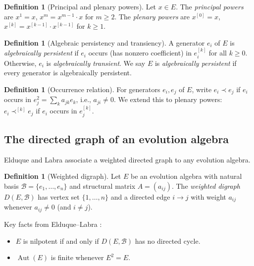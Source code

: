 \documentclass[12pt,a4paper]{amsart}
\theoremstyle{definition}
\newtheorem{definition}[theorem]{Definition}
\DeclareMathOperator{\Aut}{Aut}
\newcommand{\EA}{E}          %
\newcommand{\natbasis}{\mathcal{B}}  %
\newcommand{\strmat}{A}      %
\begin{document}
\begin{definition}[Principal and plenary powers]\label{def:powers}
Let $x\in\EA$.  The \emph{principal powers} are $x^1=x$, $x^m=x^{m-1}\cdot x$ for
$m\ge 2$.  The \emph{plenary powers} are $x^{[0]}=x$, $x^{[k]}=
x^{[k-1]}\cdot x^{[k-1]}$ for $k\ge 1$.
\end{definition}

\begin{definition}[Algebraic persistency and transiency]\label{def:persist}
A generator $e_i$ of $\EA$ is \emph{algebraically persistent} if $e_i$
occurs (has nonzero coefficient) in $e_i^{[k]}$ for all $k\ge 0$.
Otherwise, $e_i$ is \emph{algebraically transient}.  We say $\EA$ is
\emph{algebraically persistent} if every generator is algebraically
persistent.
\end{definition}

\begin{definition}[Occurrence relation]\label{def:occur}
For generators $e_i,e_j$ of $\EA$, write $e_i\prec e_j$ if $e_i$
occurs in $e_j^2=\sum_k a_{jk} e_k$, i.e., $a_{ji}\ne 0$.  We extend
this to plenary powers: $e_i\prec^{[k]} e_j$ if $e_i$ occurs in
$e_j^{[k]}$.
\end{definition}

\subsection{The directed graph of an evolution algebra}

Elduque and Labra \cite{ElduqueLabra2013} associate a weighted directed
graph to any evolution algebra.

\begin{definition}[Weighted digraph]\label{def:digraph}
Let $\EA$ be an evolution algebra with natural basis $\natbasis=
\{e_1,\ldots,e_n\}$ and structural matrix $\strmat=(a_{ij})$.  The
\emph{weighted digraph} $D(\EA,\natbasis)$ has vertex set $\{1,\ldots,n\}$
and a directed edge $i\to j$ with weight $a_{ij}$ whenever
$a_{ij}\ne 0$ (and $i\ne j$).
\end{definition}

Key facts from Elduque--Labra \cite{ElduqueLabra2013}:
\begin{itemize}
  \item $\EA$ is nilpotent if and only if $D(\EA,\natbasis)$ has no
        directed cycle.
  \item $\Aut(\EA)$ is finite whenever $\EA^2=\EA$.
\end{itemize}
\end{document}
